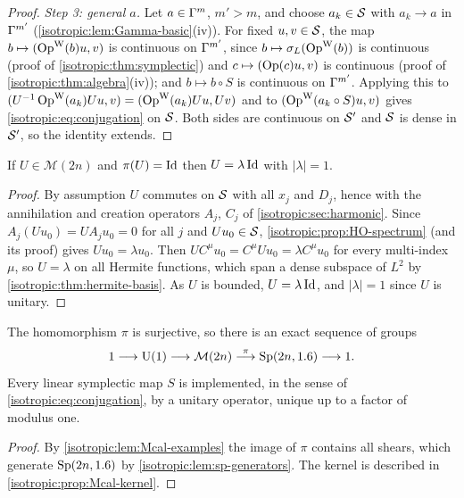\begin{proof}
\emph{Step 3: general $a$.} Let $a\in\Gamma^{m}$, $m'>m$, and choose $a_k\in\mathcal{S}$
with $a_k\to a$ in $\Gamma^{m'}$ (\cref{isotropic:lem:Gamma-basic}(iv)). For fixed
$u,v\in\mathcal{S}$, the map $b\mapsto(\operatorname{Op}^{\mathrm{W}}(b)u,v)$ is continuous on $\Gamma^{m'}$, since
$b\mapsto\sigma_L(\operatorname{Op}^{\mathrm{W}}(b))$ is continuous (proof of \cref{isotropic:thm:symplectic})
and $c\mapsto(\operatorname{Op}(c)u,v)$ is continuous (proof of
\cref{isotropic:thm:algebra}(iv)); and $b\mapsto b\circ S$ is continuous on
$\Gamma^{m'}$. Applying this to
$(U^{-1}\operatorname{Op}^{\mathrm{W}}(a_k)Uu,v)=(\operatorname{Op}^{\mathrm{W}}(a_k)Uu,Uv)$ and to $(\operatorname{Op}^{\mathrm{W}}(a_k\circ S)u,v)$ gives
\eqref{isotropic:eq:conjugation} on $\mathcal{S}$. Both sides are continuous on $\mathcal{S}'$
and $\mathcal{S}$ is dense in $\mathcal{S}'$, so the identity extends.
\end{proof}

\begin{proposition}\label{isotropic:prop:Mcal-kernel}
If $U\in\mathcal M(2n)$ and $\pi(U)=\operatorname{Id}$ then $U=\lambda\operatorname{Id}$ with $|\lambda|=1$.
\end{proposition}
\begin{proof}
By assumption $U$ commutes on $\mathcal{S}$ with all $x_j$ and $D_j$, hence with the
annihilation and creation operators $A_j$, $C_j$ of
\cref{isotropic:sec:harmonic}. Since $A_j(Uu_0)=UA_ju_0=0$ for all $j$ and
$Uu_0\in\mathcal{S}$, \cref{isotropic:prop:HO-spectrum} (and its proof) gives
$Uu_0=\lambda u_0$. Then $UC^\mu u_0=C^\mu Uu_0=\lambda C^\mu u_0$ for every
multi-index $\mu$, so $U=\lambda$ on all Hermite functions, which span a dense
subspace of $L^2$ by \cref{isotropic:thm:hermite-basis}. As $U$ is bounded,
$U=\lambda\operatorname{Id}$, and $|\lambda|=1$ since $U$ is unitary.
\end{proof}

\begin{corollary}\label{isotropic:cor:Mcal-exact}
The homomorphism $\pi$ is surjective, so there is an exact sequence of groups
\begin{equation*}
  1\longrightarrow\mathrm U(1)\longrightarrow\mathcal M(2n)\overset{\pi}{\longrightarrow}\mathrm{Sp}(2n,1.6)\longrightarrow1 .
\end{equation*}
Every linear symplectic map $S$ is implemented, in the sense of
\eqref{isotropic:eq:conjugation}, by a unitary operator, unique up to a factor of
modulus one.
\end{corollary}
\begin{proof}
By \cref{isotropic:lem:Mcal-examples} the image of $\pi$ contains all shears,
which generate $\mathrm{Sp}(2n,1.6)$ by \cref{isotropic:lem:sp-generators}. The
kernel is described in \cref{isotropic:prop:Mcal-kernel}.
\end{proof}


